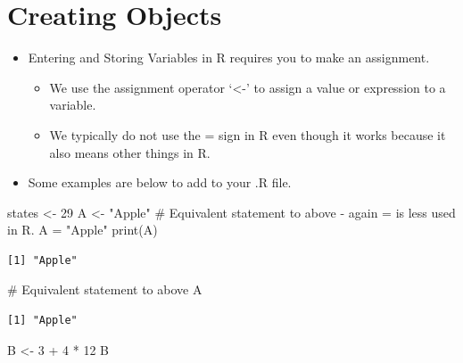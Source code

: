 \documentclass[
  letterpaper,
  DIV=11,
  numbers=noendperiod]{scrreprt}
\newenvironment{Shaded}{\begin{snugshade}}{\end{snugshade}}
\newcommand{\CommentTok}[1]{\textcolor[rgb]{0.37,0.37,0.37}{#1}}
\newcommand{\DecValTok}[1]{\textcolor[rgb]{0.68,0.00,0.00}{#1}}
\newcommand{\FunctionTok}[1]{\textcolor[rgb]{0.28,0.35,0.67}{#1}}
\newcommand{\NormalTok}[1]{\textcolor[rgb]{0.00,0.23,0.31}{#1}}
\newcommand{\OtherTok}[1]{\textcolor[rgb]{0.00,0.23,0.31}{#1}}
\newcommand{\SpecialCharTok}[1]{\textcolor[rgb]{0.37,0.37,0.37}{#1}}
\newcommand{\StringTok}[1]{\textcolor[rgb]{0.13,0.47,0.30}{#1}}
\providecommand{\tightlist}{%
  \setlength{\itemsep}{0pt}\setlength{\parskip}{0pt}}\usepackage{longtable,booktabs,array}
\begin{document}
\section{Creating Objects}\label{creating-objects}

\begin{itemize}
\tightlist
\item
  Entering and Storing Variables in R requires you to make an
  assignment.

  \begin{itemize}
  \tightlist
  \item
    We use the assignment operator `\textless-' to assign a value or
    expression to a variable.
  \item
    We typically do not use the = sign in R even though it works because
    it also means other things in R.
  \end{itemize}
\item
  Some examples are below to add to your .R file.
\end{itemize}

\begin{Shaded}
\begin{Highlighting}[]
\NormalTok{states }\OtherTok{\textless{}{-}} \DecValTok{29}
\NormalTok{A }\OtherTok{\textless{}{-}} \StringTok{"Apple"}
\CommentTok{\# Equivalent statement to above {-} again = is less used in R.}
\NormalTok{A }\OtherTok{=} \StringTok{"Apple"}
\FunctionTok{print}\NormalTok{(A)}
\end{Highlighting}
\end{Shaded}

\begin{verbatim}
[1] "Apple"
\end{verbatim}

\begin{Shaded}
\begin{Highlighting}[]
\CommentTok{\# Equivalent statement to above}
\NormalTok{A}
\end{Highlighting}
\end{Shaded}

\begin{verbatim}
[1] "Apple"
\end{verbatim}

\begin{Shaded}
\begin{Highlighting}[]
\NormalTok{B }\OtherTok{\textless{}{-}} \DecValTok{3} \SpecialCharTok{+} \DecValTok{4} \SpecialCharTok{*} \DecValTok{12}
\NormalTok{B}
\end{Highlighting}
\end{Shaded}
\end{document}
